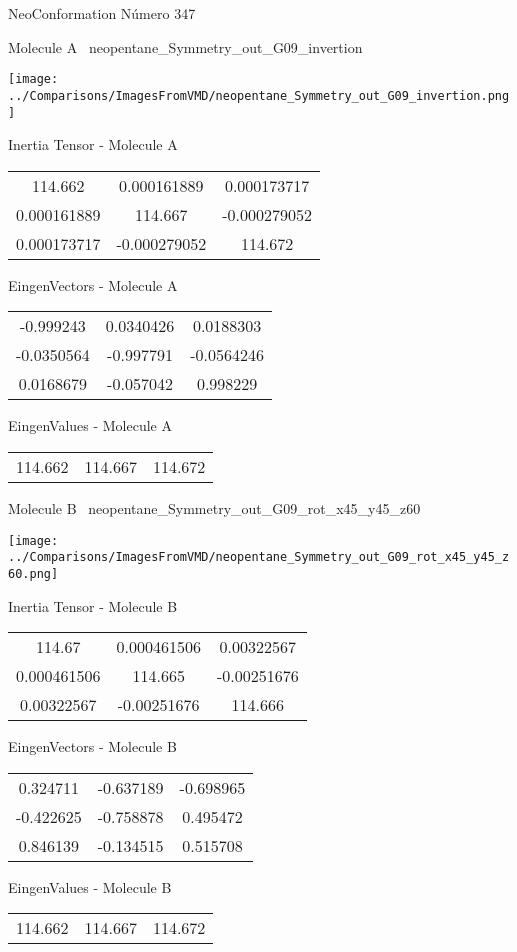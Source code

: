 \vtab[-3cm]
\begin{center}
{\large NeoConformation \tab Número 347}
\end{center}
\begin{multicols}{2}
\begin{center}

Molecule A \
neopentane\_Symmetry\_out\_G09\_invertion

\texttt{[image: ../Comparisons/ImagesFromVMD/neopentane\_Symmetry\_out\_G09\_invertion.png]}

Inertia Tensor - Molecule A \\
\begin{tabular}{|c c c|}
114.662	 & 	0.000161889	 & 	0.000173717	 \\
0.000161889	 & 	114.667	 & 	-0.000279052	 \\
0.000173717	 & 	-0.000279052	 & 	114.672
\end{tabular}

\vtab
 EingenVectors - Molecule A     \\
\begin{tabular}{|c c c|}
-0.999243	 & 	0.0340426	 & 	0.0188303	 \\
-0.0350564	 & 	-0.997791	 & 	-0.0564246	 \\
0.0168679	 & 	-0.057042	 & 	0.998229
\end{tabular}

\vtab
 EingenValues - Molecule A     \\
\begin{tabular}{|c c c|}
114.662	 & 	114.667	 & 	114.672	 \\
\end{tabular}
\columnbreak

Molecule B \
neopentane\_Symmetry\_out\_G09\_rot\_x45\_y45\_z60

\texttt{[image: ../Comparisons/ImagesFromVMD/neopentane\_Symmetry\_out\_G09\_rot\_x45\_y45\_z60.png]}

Inertia Tensor - Molecule B \\
\begin{tabular}{|c c c|}
114.67	 & 	0.000461506	 & 	0.00322567	 \\
0.000461506	 & 	114.665	 & 	-0.00251676	 \\
0.00322567	 & 	-0.00251676	 & 	114.666
\end{tabular}

\vtab
 EingenVectors - Molecule B     \\
\begin{tabular}{|c c c|}
0.324711	 & 	-0.637189	 & 	-0.698965	 \\
-0.422625	 & 	-0.758878	 & 	0.495472	 \\
0.846139	 & 	-0.134515	 & 	0.515708
\end{tabular}

\vtab
 EingenValues - Molecule B     \\
\begin{tabular}{|c c c|}
114.662	 & 	114.667	 & 	114.672	 \\
\end{tabular}

\end{center}
\end{multicols}

